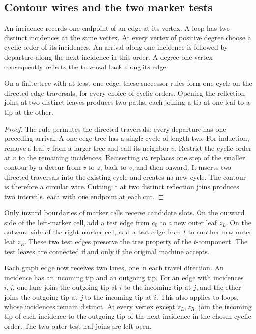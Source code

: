 \subsection{Contour wires and the two marker tests}

An incidence records one endpoint of an edge at its vertex. A loop has
two distinct incidences at the same vertex. At every vertex of positive
degree choose a cyclic order of its incidences. An arrival along one
incidence is followed by departure along the next incidence in this
order. A degree-one vertex consequently reflects the traversal back
along its edge.

\begin{lemma}\label{btc:mach:contour}
On a finite tree with at least one edge, these successor rules form one
cycle on the directed edge traversals, for every choice of cyclic
orders. Opening the reflection joins at two distinct leaves produces
two paths, each joining a tip at one leaf to a tip at the other.
\end{lemma}

\begin{proof}
The rule permutes the directed traversals: every departure has one
preceding arrival. A one-edge tree has a single cycle of length two.
For induction, remove a leaf $z$ from a larger tree and call its neighbor
$v$. Restrict the cyclic order at $v$ to the remaining incidences.
Reinserting $vz$ replaces one step of the smaller contour by a detour
from $v$ to $z$, back to $v$, and then onward. It inserts two directed
traversals into the existing cycle and creates no new cycle. The contour
is therefore a circular wire. Cutting it at two distinct reflection
joins produces two intervals, each with one endpoint at each cut.
\end{proof}

Only inward boundaries of marker cells receive candidate slots. On the
outward side of the left-marker cell, add a test edge from $c_0$ to a
new outer leaf $z_L$. On the outward side of the right-marker cell, add
a test edge from $t$ to another new outer leaf $z_R$. These two test
edges preserve the tree property of the $t$-component. The test leaves
are connected if and only if the original machine accepts.

Each graph edge now receives two lanes, one in each travel direction.
An incidence has an incoming tip and an outgoing tip. For an edge with
incidences $i,j$, one lane joins the outgoing tip at $i$ to the incoming
tip at $j$, and the other joins the outgoing tip at $j$ to the incoming
tip at $i$. This also applies to loops, whose incidences remain distinct.
At every vertex except $z_L,z_R$, join the incoming tip of each incidence
to the outgoing tip of the next incidence in the chosen cyclic order.
The two outer test-leaf joins are left open.

